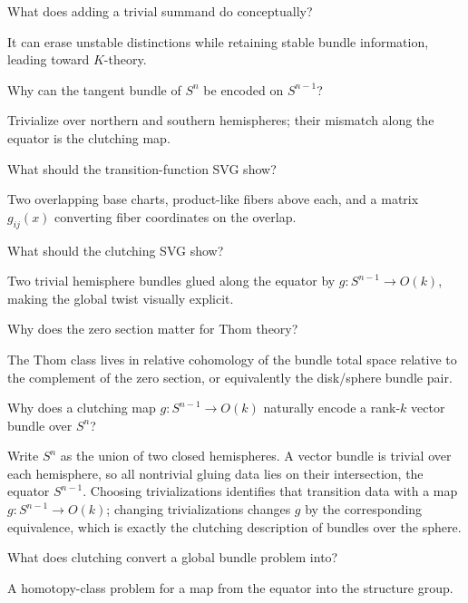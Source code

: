 \begin{problem}\label{prob:viii30-16}
What does adding a trivial summand do conceptually?
\end{problem}
\begin{solution}
It can erase unstable distinctions while retaining stable bundle information, leading toward \(K\)-theory.
\end{solution}

\begin{problem}\label{prob:viii30-17}
Why can the tangent bundle of \(S^n\) be encoded on \(S^{n-1}\)?
\end{problem}
\begin{solution}
Trivialize over northern and southern hemispheres; their mismatch along the equator is the clutching map.
\end{solution}

\begin{problem}\label{prob:viii30-18}
What should the transition-function SVG show?
\end{problem}
\begin{solution}
Two overlapping base charts, product-like fibers above each, and a matrix \(g_{ij}(x)\) converting fiber coordinates on the overlap.
\end{solution}

\begin{problem}\label{prob:viii30-19}
What should the clutching SVG show?
\end{problem}
\begin{solution}
Two trivial hemisphere bundles glued along the equator by \(g:S^{n-1}\to O(k)\), making the global twist visually explicit.
\end{solution}

\begin{problem}[Bridge]\label{prob:viii30-20}
Why does the zero section matter for Thom theory?
\end{problem}
\begin{solution}
The Thom class lives in relative cohomology of the bundle total space relative to the complement of the zero section, or equivalently the disk/sphere bundle pair.
\end{solution}

\begin{problem}\label{prob:viii30-21}
Why does a clutching map \(g:S^{n-1}\to O(k)\) naturally encode a rank-\(k\)
vector bundle over \(S^n\)?
\end{problem}
\begin{solution}
Write \(S^n\) as the union of two closed hemispheres. A vector bundle is
trivial over each hemisphere, so all nontrivial gluing data lies on their
intersection, the equator \(S^{n-1}\). Choosing trivializations identifies that
transition data with a map \(g:S^{n-1}\to O(k)\); changing trivializations
changes \(g\) by the corresponding equivalence, which is exactly the clutching
description of bundles over the sphere.
\end{solution}

\begin{problem}\label{prob:viii30-22}
What does clutching convert a global bundle problem into?
\end{problem}
\begin{solution}
A homotopy-class problem for a map from the equator into the structure group.
\end{solution}
